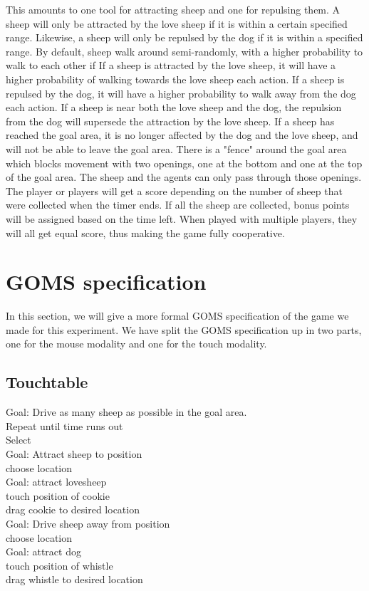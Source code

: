 \documentclass[a4paper,10pt]{report}
\newcommand{\tab}{\hspace*{1em}}
\begin{document}
This amounts to one tool for attracting sheep and one for repulsing them. 
A sheep will only be attracted by the love sheep if it is within a certain specified range.
Likewise, a sheep will only be repulsed by the dog if it is within a specified range.
By default, sheep walk around semi-randomly, with a higher probability to walk to each other if 
If a sheep is attracted by the love sheep, it will have a higher probability of walking towards the love sheep each action.
If a sheep is repulsed by the dog, it will have a higher probability to walk away from the dog each action.
If a sheep is near both the love sheep and the dog, the repulsion from the dog will supersede the attraction by the love sheep.
If a sheep has reached the goal area, it is no longer affected by the dog and the love sheep, and will not be able to leave the goal area.
There is a "fence" around the goal area which blocks movement with two openings, one at the bottom and one at the top of the goal area.
The sheep and the agents can only pass through those openings. 
The player or players will get a score depending on the number of sheep that were collected when the timer ends.
If all the sheep are collected, bonus points will be assigned based on the time left.
When played with multiple players, they will all get equal score, thus making the game fully cooperative.

\section{GOMS specification}
In this section, we will give a more formal GOMS specification of the game we made for this experiment. We have split the GOMS specification up in two parts, one for the mouse modality and one for the touch modality.
\subsection{Touchtable}
Goal: Drive as many sheep as possible in the goal area.
\\
\tab Repeat until time runs out \\
\tab \tab Select \\
\tab  \tab \tab Goal: Attract sheep to position\\
\tab \tab \tab \tab choose location \\
\tab \tab \tab \tab Goal: attract lovesheep \\
\tab \tab \tab \tab \tab touch position of cookie \\
\tab \tab \tab \tab \tab drag cookie to desired location \\
\tab \tab \tab Goal: Drive sheep away from position\\
\tab \tab \tab \tab choose location \\
\tab \tab \tab \tab Goal: attract dog \\
\tab \tab \tab \tab \tab touch position of whistle \\
\tab \tab \tab \tab \tab drag whistle to desired location\\
\end{document}

